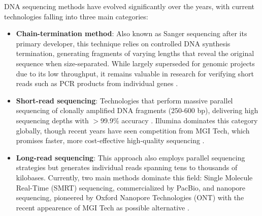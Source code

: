 
DNA sequencing methods have evolved significantly over the years, with current 
technologies falling into three main categories:

\begin{itemize}[label=\tiny\raise.5ex\hbox{•}, leftmargin=\parindent]
    
    \item \textbf{Chain-termination method}: Also known as Sanger sequencing 
    after its primary developer, this technique relies on controlled DNA synthesis 
    termination, generating fragments of varying lengths that reveal the original 
    sequence when size-separated. While largely superseded for genomic projects 
    due to its low throughput, it remains valuable in research for verifying 
    short reads such as PCR products from individual genes 
    \cite{moorcraft_understanding_2015}.

    \item \textbf{Short-read sequencing}: Technologies that perform massive 
    parallel sequencing of clonally amplified DNA fragments (250-600 bp), 
    delivering high sequencing depths with $>$99.9\% accuracy
    \cite{logsdon_long-read_2020}. Illumina dominates this category globally, 
    though recent years have seen competition from MGI Tech, which promises 
    faster, more cost-effective high-quality sequencing
    \cite{jeon_comparison_2021}.

    \item \textbf{Long-read sequencing}: This approach also employs parallel 
    sequencing strategies but generates individual reads spanning tens to 
    thousands of kilobases. Currently, two main methods dominate this field: 
    Single Molecule Real-Time (SMRT) sequencing, commercialized by PacBio, and 
    nanopore sequencing, pioneered by Oxford Nanopore Technologies (ONT) 
    \cite{logsdon_long-read_2020} with the recent appearence of MGI Tech as
    possible alternative \cite{zhang_single-molecule_2024}.

\end{itemize}

